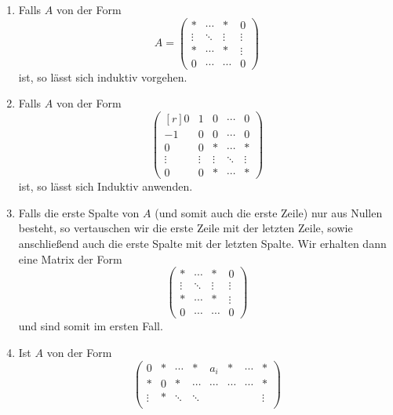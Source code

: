 \begin{enumerate}
  \item
    Falls $A$ von der Form
    \[
        A
      = \begin{pmatrix}
          *       & \cdots  & *       & 0       \\
          \vdots  & \ddots  & \vdots  & \vdots  \\
          *       & \cdots  & *       & \vdots  \\
          0       & \cdots  & \cdots  & 0
        \end{pmatrix}
    \]
    ist, so lässt sich induktiv vorgehen.
  \item
    Falls $A$ von der Form
    \[
    \begin{pmatrix*}[r]
       0      & 1       & 0       & \cdots  & 0       \\
      -1      & 0       & 0       & \cdots  & 0       \\
       0      & 0       & *       & \cdots  & *       \\
       \vdots & \vdots  & \vdots  & \ddots  & \vdots  \\
       0      & 0       & *       & \cdots  & *
    \end{pmatrix*}
    \]
    ist, so lässt sich Induktiv anwenden.
  \item
    Falls die erste Spalte von $A$ (und somit auch die erste Zeile) nur aus Nullen besteht, so vertauschen wir die erste Zeile mit der letzten Zeile, sowie anschließend auch die erste Spalte mit der letzten Spalte.
    Wir erhalten dann eine Matrix der Form
    \[
      \begin{pmatrix}
        *       & \cdots  & *       & 0       \\
        \vdots  & \ddots  & \vdots  & \vdots  \\
        *       & \cdots  & *       & \vdots  \\
        0       & \cdots  & \cdots  & 0
      \end{pmatrix}
    \]
    und sind somit im ersten Fall.
  \item
    Ist $A$ von der Form
    \[
      \begin{pmatrix}
        0       & *       & \cdots  & *       & a_i     & *       & \cdots  & *       \\
        *       & 0       & *       & \cdots  & \cdots  & \cdots  & \cdots  & *       \\
        \vdots  & *       & \ddots  & \ddots  &         &         &         & \vdots  \\

\end{pmatrix}\]
\end{enumerate}
